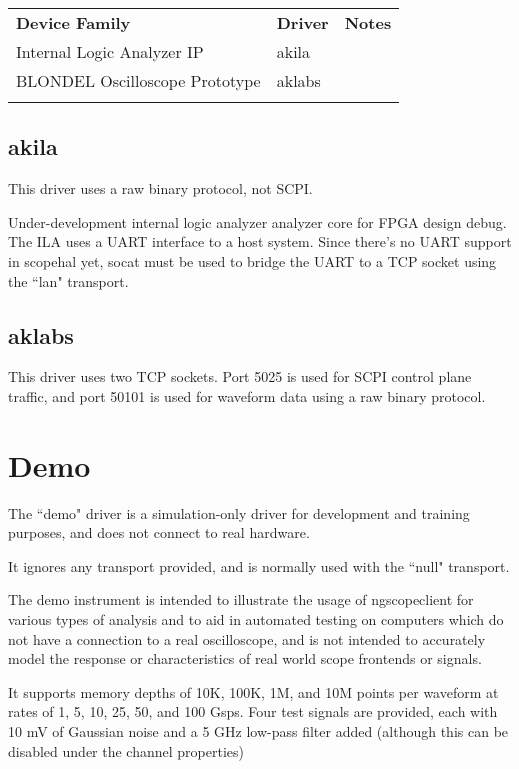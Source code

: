 \begin{tabularx}{16cm}{llX}
\thickhline
\textbf{Device Family} & \textbf{Driver} & \textbf{Notes} \\
\thickhline
Internal Logic Analyzer IP & akila & \\
\thickhline
BLONDEL Oscilloscope Prototype & aklabs & \\
\thickhline
\end{tabularx}

\subsection{akila}

This driver uses a raw binary protocol, not SCPI.

Under-development internal logic analyzer analyzer core for FPGA design debug. The ILA uses a UART interface to a host
system. Since there's no UART support in scopehal yet, socat must be used to bridge the UART to a TCP socket using
the ``lan" transport.

\subsection{aklabs}

This driver uses two TCP sockets. Port 5025 is used for SCPI control plane traffic, and port 50101 is used for waveform
data using a raw binary protocol.

\section{Demo}

The ``demo" driver is a simulation-only driver for development and training purposes, and does not connect to real
hardware.

It ignores any transport provided, and is normally used with the ``null" transport.

The demo instrument is intended to illustrate the usage of ngscopeclient for various types of analysis and to aid in
automated testing on computers which do not have a connection to a real oscilloscope, and is not intended to accurately
model the response or characteristics of real world scope frontends or signals.

It supports memory depths of 10K, 100K, 1M, and 10M points per waveform at rates of 1, 5, 10, 25, 50, and 100 Gsps.
Four test signals are provided, each with 10 mV of Gaussian noise and a 5 GHz low-pass filter added (although this can
be disabled under the channel properties)

